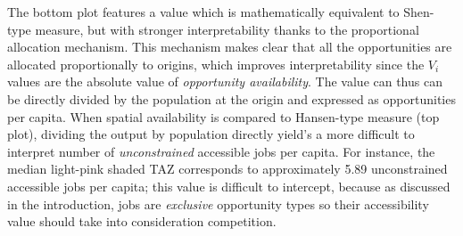 \documentclass[]{elsarticle} %
\begin{document}
The bottom plot features a value which is mathematically equivalent to
Shen-type measure, but with stronger interpretability thanks to the
proportional allocation mechanism. This mechanism makes clear that all
the opportunities are allocated proportionally to origins, which
improves interpretability since the \(V_i\) values are the absolute
value of \emph{opportunity availability}. The value can thus can be
directly divided by the population at the origin and expressed as
opportunities per capita. When spatial availability is compared to
Hansen-type measure (top plot), dividing the output by population
directly yield's a more difficult to interpret number of
\emph{unconstrained} accessible jobs per capita. For instance, the
median light-pink shaded TAZ corresponds to approximately 5.89
unconstrained accessible jobs per capita; this value is difficult to
intercept, because as discussed in the introduction, jobs are
\emph{exclusive} opportunity types so their accessibility value should
take into consideration competition.
\end{document}
